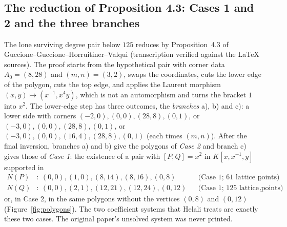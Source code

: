\documentclass[11pt]{article}
\theoremstyle{remark}
\begin{document}
\subsection{The reduction of Proposition 4.3: Cases 1 and 2 and the three branches}\label{sec:prop43}

The lone surviving degree pair below $125$ reduces by Proposition~4.3 of
Guccione--Guccione--Horruitiner--Valqui \cite{GGHV2022} (transcription verified against the LaTeX
sources). The proof starts from the hypothetical pair with corner data $A_0=(8,28)$ and $(m,n)=(3,2)$, swaps the
coordinates, cuts the lower edge of the polygon, cuts the top edge, and applies the Laurent morphism
$(x,y)\mapsto(x^{-1},x^4y)$, which is not an automorphism and turns the bracket $1$ into $x^2$. The lower-edge step has
three outcomes, the \emph{branches} a), b) and c): a lower side with corners $(-2,0),(0,0),(28,8),(0,1)$, or
$(-3,0),(0,0),(28,8),(0,1)$, or $(-3,0),(0,0),(16,4),(28,8),(0,1)$ (each times $(m,n)$). After the final inversion, branches a) and b) give
the polygons of \emph{Case 2} and branch c) gives those of \emph{Case 1}: the existence of a pair with
$[P,Q]=x^2$ in $K[x,x^{-1},y]$ supported in
\[
\begin{aligned}
N(P)&:\ (0,0),(1,0),(8,14),(8,16),(0,8) &&\text{(Case 1; $61$ lattice points)},\\
N(Q)&:\ (0,0),(2,1),(12,21),(12,24),(0,12) &&\text{(Case 1; $125$ lattice points)},
\end{aligned}
\]
or, in Case 2, in the same polygons without the vertices $(0,8)$ and $(0,12)$ (Figure~\ref{fig:polygons}). The two coefficient systems
that Helali treats are exactly these two cases. The original paper's unsolved system was never printed.
\end{document}
